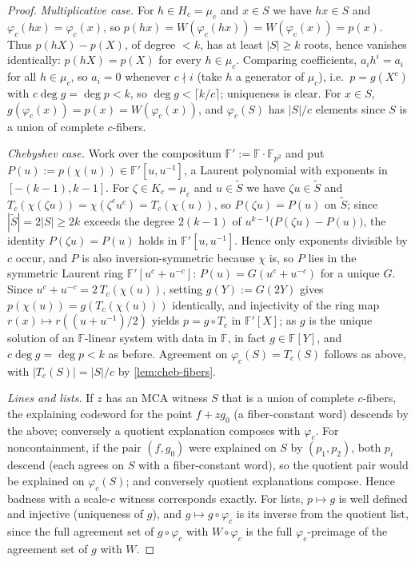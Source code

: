 \documentclass[11pt]{article}
\theoremstyle{definition}
\theoremstyle{remark}
\newcommand{\F}{\mathbb{F}}
\begin{document}
\begin{proof}
\emph{Multiplicative case.} For $h\in H_c=\mu_c$ and $x\in S$ we have $hx\in S$ and $\varphi_c(hx)=\varphi_c(x)$, so $p(hx)=W(\varphi_c(hx))=W(\varphi_c(x))=p(x)$. Thus $p(hX)-p(X)$, of degree $<k$, has at least $|S|\ge k$ roots, hence vanishes identically: $p(hX)=p(X)$ for every $h\in\mu_c$. Comparing coefficients, $a_ih^i=a_i$ for all $h\in\mu_c$, so $a_i=0$ whenever $c\nmid i$ (take $h$ a generator of $\mu_c$), i.e.\ $p=g(X^c)$ with $c\deg g=\deg p<k$, so $\deg g<\lceil k/c\rceil$; uniqueness is clear. For $x\in S$, $g(\varphi_c(x))=p(x)=W(\varphi_c(x))$, and $\varphi_c(S)$ has $|S|/c$ elements since $S$ is a union of complete $c$-fibers.

\emph{Chebyshev case.} Work over the compositum $\F':=\F\cdot\F_{p^2}$ and put $P(u):=p(\chi(u))\in\F'[u,u^{-1}]$, a Laurent polynomial with exponents in $[-(k-1),k-1]$. For $\zeta\in K_c=\mu_c$ and $u\in\widetilde S$ we have $\zeta u\in\widetilde S$ and $T_c(\chi(\zeta u))=\chi(\zeta^cu^c)=T_c(\chi(u))$, so $P(\zeta u)=P(u)$ on $\widetilde S$; since $|\widetilde S|=2|S|\ge2k$ exceeds the degree $2(k-1)$ of $u^{k-1}\bigl(P(\zeta u)-P(u)\bigr)$, the identity $P(\zeta u)=P(u)$ holds in $\F'[u,u^{-1}]$. Hence only exponents divisible by $c$ occur, and $P$ is also inversion-symmetric because $\chi$ is, so $P$ lies in the symmetric Laurent ring $\F'[u^c+u^{-c}]$: $P(u)=G(u^c+u^{-c})$ for a unique $G$. Since $u^c+u^{-c}=2\,T_c(\chi(u))$, setting $g(Y):=G(2Y)$ gives $p(\chi(u))=g(T_c(\chi(u)))$ identically, and injectivity of the ring map $r(x)\mapsto r((u+u^{-1})/2)$ yields $p=g\circ T_c$ in $\F'[X]$; as $g$ is the unique solution of an $\F$-linear system with data in $\F$, in fact $g\in\F[Y]$, and $c\deg g=\deg p<k$ as before. Agreement on $\varphi_c(S)=T_c(S)$ follows as above, with $|T_c(S)|=|S|/c$ by \cref{lem:cheb-fibers}.

\emph{Lines and lists.} If $z$ has an MCA witness $S$ that is a union of complete $c$-fibers, the explaining codeword for the point $f+zg_0$ (a fiber-constant word) descends by the above; conversely a quotient explanation composes with $\varphi_c$. For noncontainment, if the pair $(f,g_0)$ were explained on $S$ by $(p_1,p_2)$, both $p_i$ descend (each agrees on $S$ with a fiber-constant word), so the quotient pair would be explained on $\varphi_c(S)$; and conversely quotient explanations compose. Hence badness with a scale-$c$ witness corresponds exactly. For lists, $p\mapsto g$ is well defined and injective (uniqueness of $g$), and $g\mapsto g\circ\varphi_c$ is its inverse from the quotient list, since the full agreement set of $g\circ\varphi_c$ with $W\circ\varphi_c$ is the full $\varphi_c$-preimage of the agreement set of $g$ with $W$.
\end{proof}
\end{document}

